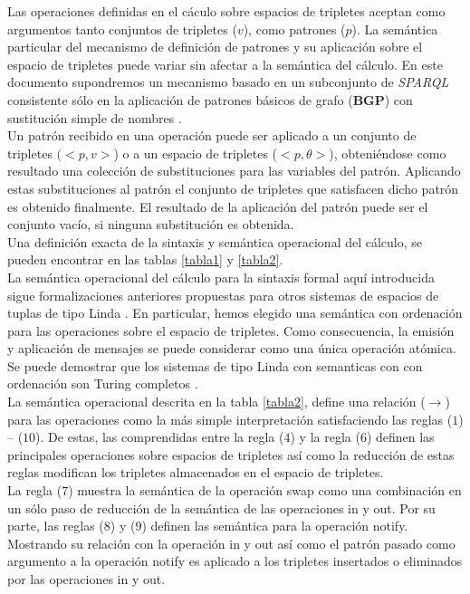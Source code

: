 Las operaciones definidas en el c\'aculo sobre espacios de tripletes aceptan como argumentos tanto conjuntos de tripletes ($v$), como patrones ($p$). La sem\'antica particular del mecanismo de definici\'on de patrones y su aplicaci\'on sobre el espacio de tripletes puede variar sin afectar a la sem\'antica del c\'alculo. En este documento supondremos un mecanismo basado en un subconjunto de \textit{SPARQL} consistente s\'olo en la aplicaci\'on de patrones b\'asicos de grafo (\textbf{BGP}) con sustituci\'on simple de nombres \cite{sparql}.\\
Un patr\'on recibido en una operaci\'on puede ser aplicado a un conjunto de tripletes $(< p,v >$) o a un espacio de tripletes ($< p,\theta >$), obteni\'endose como resultado una colecci\'on de substituciones para las variables del patr\'on. Aplicando estas substituciones al patr\'on el conjunto de tripletes que satisfacen dicho patr\'on es obtenido finalmente. El resultado de la aplicaci\'on del patr\'on puede ser el conjunto vac\'io, si ninguna substituci\'on es obtenida.\\
Una definici\'on exacta de la sintaxis y sem\'antica operacional del c\'alculo, se pueden encontrar en las tablas \ref{tabla1} y \ref{tabla2}.\\

La sem\'antica operacional del c\'alculo para la sintaxis formal aqu\'i introducida sigue formalizaciones anteriores propuestas para otros sistemas de espacios de tuplas de tipo Linda \cite{linda}. En particular, hemos elegido una sem\'antica con ordenaci\'on para las operaciones sobre el espacio de tripletes. Como consecuencia, la emisi\'on y aplicaci\'on de mensajes se puede considerar como una \'unica operaci\'on at\'omica. Se puede demostrar que los sistemas de tipo Linda con semanticas con con ordenaci\'on son Turing completos \cite{busi2000expressiveness}.\\
La sem\'antica operacional descrita en la tabla \ref{tabla2}, define una relaci\'on ($\rightarrow$) para las operaciones como la m\'as simple interpretaci\'on satisfaciendo las reglas ($1$) – ($10$). De estas, las comprendidas entre la regla ($4$)  y la regla ($6$) definen las principales operaciones sobre espacios de tripletes as\'i como la reducci\'on de estas reglas modifican los tripletes almacenados en el espacio de tripletes.\\
La regla ($7$) muestra la sem\'antica de la operaci\'on swap como una combinaci\'on en un s\'olo paso de reducci\'on de la sem\'antica de las operaciones in y out. Por su parte, las reglas ($8$) y ($9$) definen las sem\'antica para la operaci\'on notify. Mostrando su relaci\'on con la operaci\'on in y out as\'i como el patr\'on pasado como argumento a la operaci\'on notify es aplicado a los tripletes insertados o eliminados por las operaciones in y out.\\

